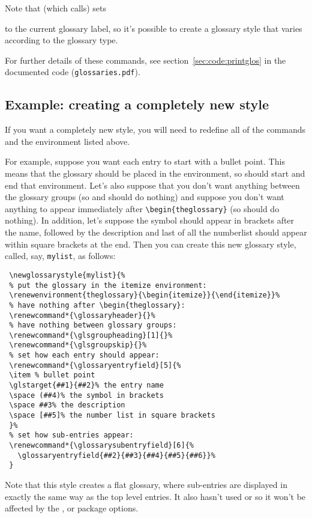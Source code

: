 \documentclass{nlctdoc}
\renewcommand*{\glsgroupskip}{}
\renewcommand*{\glossaryentryfield}[5]{%
    \item[\glsentryitem{#1}\glstarget{#1}{#2}]\mbox{}\newline
      #3\glspostdescription\space #5\newline}%
\begin{document}
Note that  (which  calls)
sets
\begin{definition}[\DescribeMacro{\currentglossary}]
\end{definition}
to the current glossary label, so it's possible to create a glossary
style that varies according to the glossary type.

For further details of these commands, see \ifpdf
section~\ref*{sec:code:printglos} \fi {}
in the documented code (\texttt{glossaries.pdf}).

\subsection{Example: creating a completely new style}

If you want a completely new style, you will need to redefine all
of the commands and the environment listed above. 

For example, suppose you want each entry to start with a bullet point.
This means that the glossary should be placed in the 
environment, so  should start and end that
environment. Let's also suppose that you don't want anything between
the glossary groups (so  and 
should do nothing) and suppose you don't want anything to appear
immediately after \verb|\begin{theglossary}| (so 
should do nothing). In addition, let's suppose the symbol should
appear in brackets after the name, followed by the description and
last of all the \gls{numberlist} should appear within square brackets
at the end. Then you can create this new glossary style, called, say,
\texttt{mylist}, as follows:
\begin{verbatim}
 \newglossarystyle{mylist}{%
 % put the glossary in the itemize environment:
 \renewenvironment{theglossary}{\begin{itemize}}{\end{itemize}}%
 % have nothing after \begin{theglossary}:
 \renewcommand*{\glossaryheader}{}%
 % have nothing between glossary groups:
 \renewcommand*{\glsgroupheading}[1]{}%
 \renewcommand*{\glsgroupskip}{}%
 % set how each entry should appear:
 \renewcommand*{\glossaryentryfield}[5]{%
 \item % bullet point
 \glstarget{##1}{##2}% the entry name
 \space (##4)% the symbol in brackets
 \space ##3% the description
 \space [##5]% the number list in square brackets
 }%
 % set how sub-entries appear:
 \renewcommand*{\glossarysubentryfield}[6]{%
   \glossaryentryfield{##2}{##3}{##4}{##5}{##6}}%
 }
\end{verbatim}
Note that this style creates a flat glossary, where sub-entries
are displayed in exactly the same way as the top level entries.
It also hasn't used  or  so
it won't be affected by the ,
 or  package options.
\end{document}
